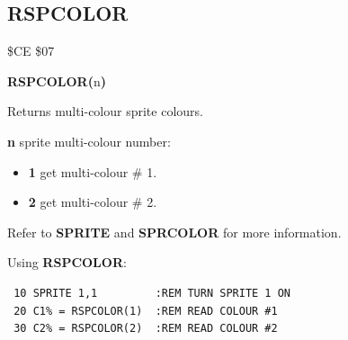 \subsection{RSPCOLOR}
\begin{description}[leftmargin=2cm,style=nextline]
\item [Token:] \$CE \$07
\item [Format:] {\bf RSPCOLOR(}n{\bf)}
\item [Usage:]  Returns multi-colour sprite colours.

                {\bf n} sprite multi-colour number:

                \begin{itemize}
                    \item {\bf 1} get multi-colour \# 1.
                    \item {\bf 2} get multi-colour \# 2.
                \end{itemize}

\item [Remarks:] Refer to {\bf SPRITE} and {\bf SPRCOLOR} for more information.

\item [Example:] Using {\bf RSPCOLOR}:
\begin{tcolorbox}[colback=black,coltext=white]
\verbatimfont{\codefont}
\begin{verbatim}
 10 SPRITE 1,1         :REM TURN SPRITE 1 ON
 20 C1% = RSPCOLOR(1)  :REM READ COLOUR #1
 30 C2% = RSPCOLOR(2)  :REM READ COLOUR #2
\end{verbatim}
\end{tcolorbox}
\end{description}


\newpage
